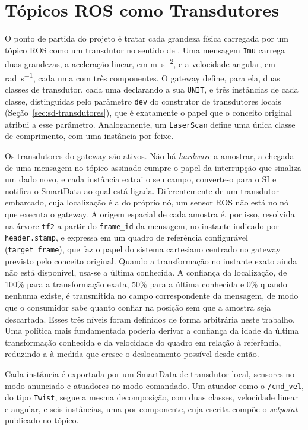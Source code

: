 \documentclass[
    12pt,
    oneside,
    a4paper,
    chapter=TITLE,
    section=TITLE,
    english,
    brazil
]{abntex2}
\begin{document}
\section{Tópicos ROS como Transdutores}
\label{sec:modelo}

O ponto de partida do projeto é tratar cada grandeza física carregada por
um tópico ROS como um transdutor no sentido de
. Uma mensagem \texttt{Imu} carrega duas
grandezas, a aceleração linear, em \si{\meter\per\square\second}, e a
velocidade angular, em \si{\radian\per\second}, cada uma com três
componentes. O gateway define, para ela, duas classes de transdutor, cada
uma declarando a sua \texttt{UNIT}, e três instâncias de cada classe,
distinguidas pelo parâmetro \texttt{dev} do construtor de transdutores
locais (Seção~\ref{sec:sd-transdutores}), que é
exatamente o papel que o conceito original atribui a esse parâmetro.
Analogamente, um \texttt{LaserScan} define uma única classe de comprimento,
com uma instância por feixe.

Os transdutores do gateway são ativos. Não há \textit{hardware} a
amostrar, a chegada de uma mensagem no tópico assinado cumpre o papel da
interrupção que sinaliza um dado novo, e cada instância extrai o seu campo,
converte-o para o SI e notifica o SmartData ao qual está ligada.
Diferentemente de um transdutor embarcado, cuja localização é a do próprio
nó, um sensor ROS não está no nó que executa o gateway. A origem espacial
de cada amostra é, por isso, resolvida na árvore \texttt{tf2} a partir do
\texttt{frame\_id} da mensagem, no instante indicado por
\texttt{header.stamp}, e expressa em um quadro de referência configurável
(\texttt{target\_frame}), que faz o papel do sistema cartesiano centrado no
gateway previsto pelo conceito original. Quando a transformação no instante
exato ainda não está disponível, usa-se a última conhecida. A confiança da
localização, de 100\% para a transformação exata, 50\% para a última
conhecida e 0\% quando nenhuma existe, é transmitida no campo
correspondente da mensagem, de modo que o consumidor sabe quanto confiar
na posição sem que a amostra seja descartada. Esses três níveis foram
definidos de forma arbitrária neste trabalho. Uma política mais
fundamentada poderia derivar a confiança da idade da última
transformação conhecida e da velocidade do quadro em relação à
referência, reduzindo-a à medida que cresce o deslocamento possível
desde então.

Cada instância é exportada por um SmartData de transdutor local,
sensores no modo anunciado e atuadores no modo comandado. Um atuador como
o \texttt{/cmd\_vel}, do tipo \texttt{Twist}, segue a mesma decomposição,
com duas classes, velocidade linear e angular, e seis instâncias, uma por
componente, cuja escrita compõe o \textit{setpoint} publicado no tópico.
\end{document}
